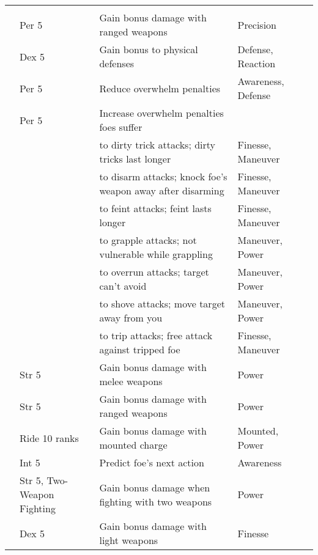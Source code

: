 {\begin{longtabu}{>{\lcol}p{10em} >{\lcol}p{15em} >{\lcol}X >{\lcol}p{6em} >{\lcol}p{3em}}
        \midrule
         &  &  &  &  \\
         & Per 5 & Gain bonus damage with ranged weapons & Precision &  \\
         & Dex 5 & Gain bonus to physical defenses & Defense, Reaction &  \\
         & Per 5 & Reduce overwhelm penalties & Awareness, Defense &  \\
         & Per 5 & Increase overwhelm penalties foes suffer & \x &  \\
         & \x &  to dirty trick attacks; dirty tricks last longer & Finesse, Maneuver &  \\
         & \x &  to disarm attacks; knock foe's weapon away after disarming & Finesse, Maneuver &  \\
         & \x &  to feint attacks; feint lasts longer & Finesse, Maneuver &  \\
         & \x &  to grapple attacks; not vulnerable while grappling & Maneuver, Power &  \\
         & \x &  to overrun attacks; target can't avoid & Maneuver, Power &  \\
         & \x &  to shove attacks; move target away from you & Maneuver, Power &  \\
         & \x &  to trip attacks; free attack against tripped foe & Finesse, Maneuver &  \\
         & Str 5 & Gain bonus damage with melee weapons & Power &  \\
         & Str 5 & Gain bonus damage with ranged weapons & Power &  \\
         & Ride 10 ranks & Gain bonus damage with mounted charge & Mounted, Power &  \\
         & Int 5 & Predict foe's next action & Awareness &  \\
         & Str 5, Two-Weapon Fighting & Gain bonus damage when fighting with two weapons & Power &  \\
         & Dex 5 & Gain bonus damage with light weapons & Finesse &  \\


\end{longtabu}}
